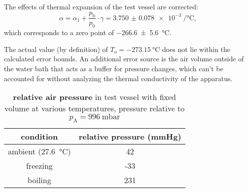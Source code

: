 The effects of thermal expansion of the test vessel are corrected:
\begin{equation*}	%
	\alpha = \alpha_1 + \frac{p_\text{b}}{p_0} \cdot \gamma = \SI{3.750(78)e-3}{\per\celsius},
\end{equation*}
which corresponds to a zero point of \SI{-266.6(56)}{\celsius}.

The actual value (by definition) of $T_\text{o} = \SI{-273.15}{\celsius}$ does not lie within the calculated error bounds.
An additional error source is the air volume outside of the water bath that acts as a buffer for pressure changes, which can't be accounted for without analyzing the thermal conductivity of the apparatus.

\begin{table}
	\centering
	\caption[Gas Thermometer Pressures]{\textbf{relative air pressure} in test vessel with fixed volume at various temperatures, pressure relative to $p_\text{A} = \SI{996}{\milli\bar}$}
	\begin{tabular}{cS}
		\toprule
		condition&
		{relative pressure (\si{\mmHg})}\\
		\midrule
		ambient (\SI{27.6}{\celsius})&	42\\
		freezing&	-33\\
		boiling&	231\\
		\bottomrule
	\end{tabular}
\end{table}
